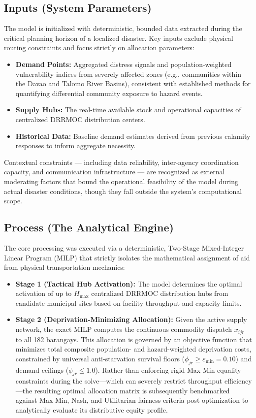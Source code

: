 \subsection{Inputs (System Parameters)}
The model is initialized with deterministic, bounded data extracted during the critical planning horizon of a localized disaster. Key inputs exclude physical routing constraints and focus strictly on allocation parameters:
\begin{itemize}
    \item \textbf{Demand Points:} Aggregated distress signals and population-weighted vulnerability indices from severely affected zones (e.g., communities within the Davao and Talomo River Basins), consistent with established methods for quantifying differential community exposure to hazard events.
    \item \textbf{Supply Hubs:} The real-time available stock and operational capacities of centralized DRRMOC distribution centers.
    \item \textbf{Historical Data:} Baseline demand estimates derived from previous calamity responses to inform aggregate necessity.
\end{itemize}
Contextual constraints — including data reliability, inter-agency coordination capacity, and communication infrastructure — are recognized as external moderating factors that bound the operational feasibility of the model during actual disaster conditions, though they fall outside the system's computational scope.

\subsection{Process (The Analytical Engine)}
The core processing was executed via a deterministic, Two-Stage Mixed-Integer Linear Program (MILP) that strictly isolates the mathematical assignment of aid from physical transportation mechanics:
\begin{itemize}
    \item \textbf{Stage 1 (Tactical Hub Activation):} The model determines the optimal activation of up to $H_{\max}$ centralized DRRMOC distribution hubs from candidate municipal sites based on facility throughput and capacity limits.
    \item \textbf{Stage 2 (Deprivation-Minimizing Allocation):} Given the active supply network, the exact MILP computes the continuous commodity dispatch $x_{ijr}$ to all 182 barangays. This allocation is governed by an objective function that minimizes total composite population- and hazard-weighted deprivation costs, constrained by universal anti-starvation survival floors ($\phi_{jr} \ge \varepsilon_{\min} = 0.10$) and demand ceilings ($\phi_{jr} \le 1.0$). Rather than enforcing rigid Max-Min equality constraints during the solve---which can severely restrict throughput efficiency---the resulting optimal allocation matrix is subsequently benchmarked against Max-Min, Nash, and Utilitarian fairness criteria post-optimization to analytically evaluate its distributive equity profile.
\end{itemize}

